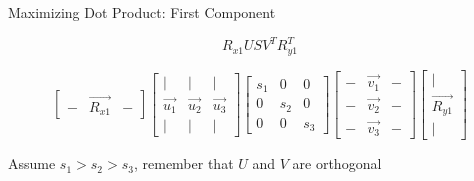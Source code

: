 \documentclass{beamer}
\begin{document}
\begin{frame}{Maximizing Dot Product: First Component}

\[ R_{x1} U S V^T R_{y1}^T \]

\small
\[ \left[ \begin{array}{ccc}-&\vec{R_{x1}}&-\end{array} \right] \left[ \begin{array}{ccc} | & | & | \\ \vec{u_1} & \vec{u_2} & \vec{u_3} \\ | & | & | \end{array} \right]  \left[ \begin{array}{ccc} s_1 & 0 & 0 \\ 0 & s_2 & 0 \\ 0 & 0 & s_3 \end{array} \right] \left[ \begin{array}{ccc} - & \vec{v_1} & - \\ - & \vec{v_2} & - \\ - & \vec{v_3} & - \end{array} \right] \left[ \begin{array}{c} | \\ \vec{R_{y1}} \\ | \end{array} \right] \]

Assume $s_1 > s_2 > s_3$, remember that $U$ and $V$ are orthogonal


\end{frame}
\end{document}
